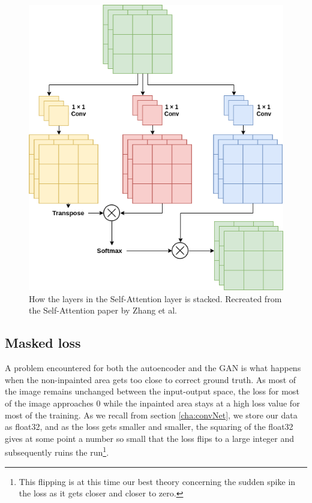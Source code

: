 \begin{figure}
\centering
\includegraphics[scale=0.4]{methodology/figures/attention.png}
\caption{How the layers in the Self-Attention layer is stacked. Recreated from the Self-Attention paper by Zhang et al.~\cite{DBLP:journals/corr/selfattention}}
\label{fig:Attention}
\end{figure}



\subsection{Masked loss}
A problem encountered for both the autoencoder and the GAN is what happens when the non-inpainted area gets too close to correct ground truth. 
As most of the image remains unchanged between the input-output space, the loss for most of the image approaches 0 while the inpainted area stays at a high loss value for most of the training. 
As we recall from section \ref{cha:convNet}, we store our data as float32, and as the loss gets smaller and smaller, the squaring of the float32 gives at some point a number so small that the loss flips to a large integer and subsequently ruins the run\footnote{This flipping is at this time our best theory concerning the sudden spike in the loss as it gets closer and closer to zero.}. 

